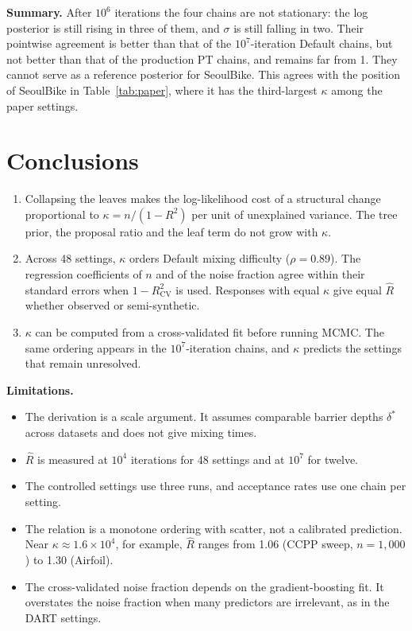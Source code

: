 \documentclass[11pt]{article}
\newcommand{\Rhat}{\hat R}
\begin{document}
\textbf{Summary.} After $10^6$ iterations the four chains are not stationary: the log posterior is still rising in three of them, and $\sigma$ is still falling in two. Their pointwise agreement is better than that of the $10^7$-iteration Default chains, but not better than that of the production PT chains, and remains far from 1. They cannot serve as a reference posterior for SeoulBike. This agrees with the position of SeoulBike in Table~\ref{tab:paper}, where it has the third-largest $\kappa$ among the paper settings.

\section{Conclusions}
\begin{enumerate}
\item Collapsing the leaves makes the log-likelihood cost of a structural change proportional to $\kappa=n/(1-R^2)$ per unit of unexplained variance. The tree prior, the proposal ratio and the leaf term do not grow with $\kappa$.
\item Across 48 settings, $\kappa$ orders Default mixing difficulty ($\rho=0.89$). The regression coefficients of $n$ and of the noise fraction agree within their standard errors when $1-R^2_{\mathrm{CV}}$ is used. Responses with equal $\kappa$ give equal $\Rhat$ whether observed or semi-synthetic.
\item $\kappa$ can be computed from a cross-validated fit before running MCMC. The same ordering appears in the $10^7$-iteration chains, and $\kappa$ predicts the settings that remain unresolved.
\end{enumerate}

\textbf{Limitations.}
\begin{itemize}
\item The derivation is a scale argument. It assumes comparable barrier depths $\delta^\ast$ across datasets and does not give mixing times.
\item $\Rhat$ is measured at $10^4$ iterations for 48 settings and at $10^7$ for twelve.
\item The controlled settings use three runs, and acceptance rates use one chain per setting.
\item The relation is a monotone ordering with scatter, not a calibrated prediction. Near $\kappa\approx1.6\times10^4$, for example, $\Rhat$ ranges from 1.06 (CCPP sweep, $n=1{,}000$) to 1.30 (Airfoil).
\item The cross-validated noise fraction depends on the gradient-boosting fit. It overstates the noise fraction when many predictors are irrelevant, as in the DART settings.
\end{itemize}
\end{document}
